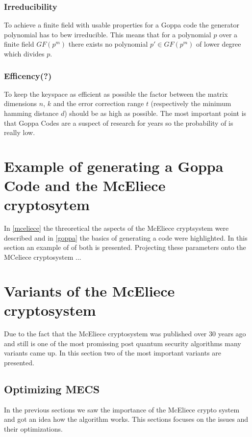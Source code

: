 \subsubsection*{Irreducibility} 
To achieve a finite field with usable properties for a Goppa code the generator polynomial has to bew irreducible. This means that for a polynomial $p$ over a finite field $GF(p^m)$ there exists no polynomial $p' \in GF(p^m)$ of lower degree which divides $p$.
 

\subsubsection*{Efficency(?)} To keep the keyspace as efficient as possible the factor between the matrix dimensions $n$, $k$ and the error correction range $t$ (respectively the minimum hamming distance $d$) should be as high as possible. The most important point is that Goppa Codes are a suspect of research for years so the probability of is really low. 




\section{Example of generating a Goppa Code and the McEliece cryptosytem}
In \ref{mceliece} the threoretical the aspects of the McEliece cryptsystem were described and in \ref{goppa} the basics of generating a code were highlighted. In this section an example of of both is presented. 
Projecting these parameters onto the MCeliece cryptosystem ... 


\section{Variants of the McEliece cryptosystem}
Due to the fact that the McEliece cryptosystem was published over 30 years ago and still is one of the most promissing post quantum security algorithms many variants came up. In this section two of the most important variants are presented. 

\subsection{Optimizing MECS}
In the previous sections we saw the importance of the McEliece crypto system and got an idea how the algorithm works. This sections focuses on the issues and their optimizations. 

